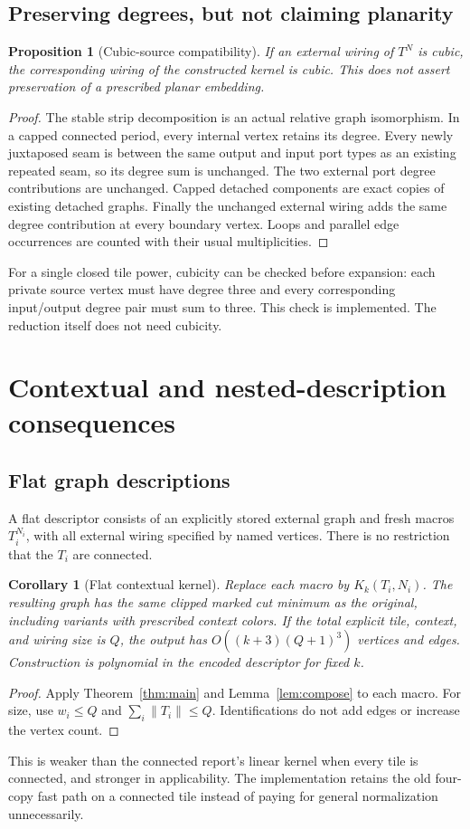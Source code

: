 \documentclass[11pt]{article}
\newtheorem{proposition}[theorem]{Proposition}
\newtheorem{corollary}[theorem]{Corollary}
\theoremstyle{remark}\newtheorem{remark}[theorem]{Remark}
\newcommand{\size}[1]{\lVert #1\rVert}
\begin{document}
\subsection{Preserving degrees, but not claiming planarity}
\begin{proposition}[Cubic-source compatibility]\label{prop:cubic}
If an external wiring of $T^N$ is cubic, the corresponding wiring of the constructed kernel is cubic. This does not assert preservation of a prescribed planar embedding.
\end{proposition}
\begin{proof}
The stable strip decomposition is an actual relative graph isomorphism. In a capped connected period, every internal vertex retains its degree. Every newly juxtaposed seam is between the same output and input port types as an existing repeated seam, so its degree sum is unchanged. The two external port degree contributions are unchanged. Capped detached components are exact copies of existing detached graphs. Finally the unchanged external wiring adds the same degree contribution at every boundary vertex. Loops and parallel edge occurrences are counted with their usual multiplicities.
\end{proof}
For a single closed tile power, cubicity can be checked before expansion: each private source vertex must have degree three and every corresponding input/output degree pair must sum to three. This check is implemented. The reduction itself does not need cubicity.

\section{Contextual and nested-description consequences}
\subsection{Flat graph descriptions}
A flat descriptor consists of an explicitly stored external graph and fresh macros $T_i^{N_i}$, with all external wiring specified by named vertices. There is no restriction that the $T_i$ are connected.

\begin{corollary}[Flat contextual kernel]\label{cor:flat}
Replace each macro by $K_k(T_i,N_i)$. The resulting graph has the same clipped marked cut minimum as the original, including variants with prescribed context colors. If the total explicit tile, context, and wiring size is $Q$, the output has $O((k+3)(Q+1)^3)$ vertices and edges. Construction is polynomial in the encoded descriptor for fixed $k$.
\end{corollary}
\begin{proof}
Apply Theorem~\ref{thm:main} and Lemma~\ref{lem:compose} to each macro. For size, use $w_i\le Q$ and $\sum_i\size{T_i}\le Q$. Identifications do not add edges or increase the vertex count.
\end{proof}
This is weaker than the connected report's linear kernel when every tile is connected, and stronger in applicability. The implementation retains the old four-copy fast path on a connected tile instead of paying for general normalization unnecessarily.
\end{document}

